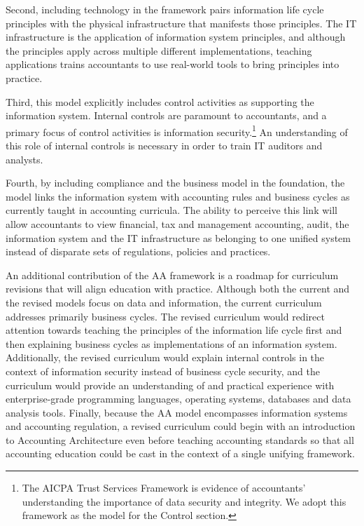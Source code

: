 \documentclass[12pt]{article}
\begin{document}
Second, including technology in the framework pairs information life cycle principles with the physical infrastructure that manifests those principles. The IT infrastructure is the application of information system principles, and although the principles apply across multiple different implementations, teaching applications trains accountants to use real-world tools to bring principles into practice.

Third, this model explicitly includes control activities as supporting the information system. Internal controls are paramount to accountants, and a primary focus of control activities is information security.\footnote{The AICPA Trust Services Framework is evidence of accountants' understanding the importance of data security and integrity. We adopt this framework as the model for the Control section.} An understanding of this role of internal controls is necessary in order to train IT auditors and analysts.

Fourth, by including compliance and the business model in the foundation, the model links the information system with accounting rules and business cycles as currently taught in accounting curricula. The ability to perceive this link will allow accountants to view financial, tax and management accounting, audit, the information system and the IT infrastructure as belonging to one unified system instead of disparate sets of regulations, policies and practices.

An additional contribution of the AA framework is a roadmap for curriculum revisions that will align education with practice. Although both the current and the revised models focus on data and information, the current curriculum addresses primarily business cycles. The revised curriculum would redirect attention towards teaching the principles of the information life cycle first and then explaining business cycles as implementations of an information system. Additionally, the revised curriculum would explain internal controls in the context of information security instead of business cycle security, and the curriculum would provide an understanding of and practical experience with enterprise-grade programming languages, operating systems, databases and data analysis tools. Finally, because the AA model encompasses information systems and accounting regulation, a revised curriculum could begin with an introduction to Accounting Architecture even before teaching accounting standards so that all accounting education could be cast in the context of a single unifying framework.
\end{document}

